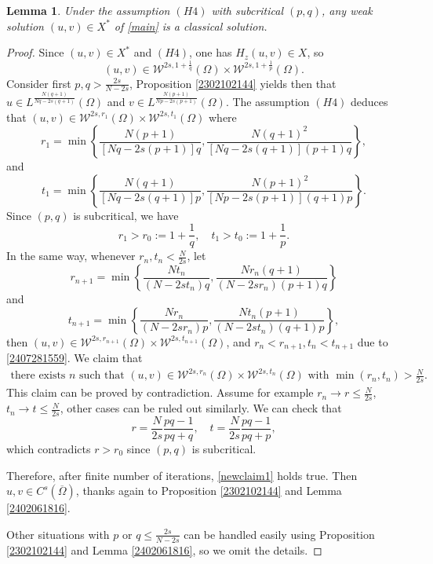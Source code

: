 \documentclass[10pt]{article}
\numberwithin{equation}{section}
\newtheorem{lemma}[theorem]{Lemma}
\numberwithin{equation}{section}
\begin{document}
\begin{lemma}\label{2407281607}
Under the assumption $(H4)$ with subcritical $(p, q)$, any weak solution $(u, v)\in X^*$ of \eqref{main} is a classical solution.
\end{lemma}
\begin{proof} Since $(u, v)\in X^*$ and $(H4)$, one has $H_z(u, v)\in X$, so
\begin{equation}\label{2407281353}
(u, v)\in\mathcal{W}^{2s, 1+\frac{1}{q}}(\Omega)\times \mathcal{W}^{2s, 1+\frac{1}{p}}(\Omega).
\end{equation}
Consider first $p, q>\frac{2s}{N-2s}$, Proposition \ref{2302102144} yields then that $u\in L^{\frac{N(q+1)}{Nq-2s(q+1)}}(\Omega)$ and $v\in L^{\frac{N(p+1)}{Np-2s(p+1)}}(\Omega)$. The assumption $(H4)$ deduces that $(u, v)\in \mathcal{W}^{2s, r_1}(\Omega)\times \mathcal{W}^{2s, t_1}(\Omega)$ where
\[
r_1=\min\left\{\frac{N(p+1)}{[Nq-2s(p+1)]q}, \frac{N(q+1)^2}{[Nq-2s(q+1)](p+1)q}\right\},
\]
and
\[
t_1=\min\left\{\frac{N(q+1)}{[Nq-2s(q+1)]p}, \frac{N(p+1)^2}{[Np-2s(p+1)](q+1)p}\right\}.
\]
Since $(p, q)$ is subcritical, we have
\begin{equation}\label{2407281559}
r_1>r_0:=1+\frac{1}{q}, \quad t_1>t_0:=1+\frac{1}{p}.
\end{equation}
In the same way, whenever $r_n, t_n < \frac{N}{2s}$, let
\[
r_{n+1}=\min\left\{\frac{Nt_n}{(N-2st_n)q}, \frac{Nr_n(q+1)}{(N-2sr_n)(p+1)q}\right\}
\]
and
\[
t_{n+1}=\min\left\{\frac{Nr_n}{(N-2sr_n)p}, \frac{Nt_n(p+1)}{(N-2st_n)(q+1)p}\right\},
\]
then $(u, v)\in \mathcal{W}^{2s, r_{n+1}}(\Omega)\times \mathcal{W}^{2s, t_{n+1}}(\Omega)$, and $r_n < r_{n+1}, t_n < t_{n+1}$ due to \eqref{2407281559}. We claim that  
\begin{align}
\label{newclaim1}
\mbox{there exists $n$ such that $(u, v)\in \mathcal{W}^{2s, r_n}(\Omega)\times \mathcal{W}^{2s, t_n}(\Omega)$ with $\min(r_n, t_n)>\frac{N}{2s}$.}
\end{align}
This claim can be proved by contradiction. Assume for example $r_n\to r \le \frac{N}{2s}$, $t_n\to t \le \frac{N}{2s}$, other cases can be ruled out similarly. We can check that
$$r=\frac{N}{2s}\frac{pq-1}{pq+q}, \quad t=\frac{N}{2s}\frac{pq-1}{pq+p},$$
which contradicts $r>r_0$ since $(p, q)$ is subcritical. 

Therefore, after finite number of iterations, \eqref{newclaim1} holds true. Then $u, v\in C^s(\overline{\Omega})$, thanks again to Proposition \ref{2302102144} and Lemma \ref{2402061816}.

 Other situations with $p$ or $q\le \frac{2s}{N-2s}$ can be handled easily using Proposition \ref{2302102144} and Lemma \ref{2402061816}, so we omit the details.
\end{proof}
\end{document}
